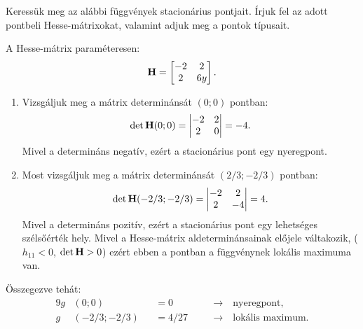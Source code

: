 \begin{exercise}{%
    Keressük meg az alábbi függvények stacionárius pontjait. Írjuk fel az adott
    pontbeli Hesse-mátrixokat, valamint adjuk meg a pontok típusait.
  }
{\begin{enumerate}[a)]
            A Hesse-mátrix paraméteresen:
            \[
              \mathbf{H} = \begin{bmatrix}
                -2 & 2 \\ 2 & 6y
              \end{bmatrix}
              \text.
            \]

            \begin{enumerate}[1)]
              \item Vizsgáljuk meg a mátrix determinánsát $(0; 0)$ pontban:
                    \[
                      \det \mathbf{H}(0;0) = \begin{vmatrix}
                        -2 & 2 \\ 2 & 0
                      \end{vmatrix} = -4 \text.
                    \]
                    Mivel a determináns negatív, ezért a stacionárius pont
                    egy nyeregpont.

              \item Most vizsgáljuk meg a mátrix determinánsát $(2/3; -2/3)$
                    pontban:
                    \[
                      \det \mathbf{H}(-2/3;-2/3) = \begin{vmatrix}
                        -2 & 2 \\ 2 & -4
                      \end{vmatrix} = 4 \text.
                    \]
                    Mivel a determináns pozitív, ezért a stacionárius pont
                    egy lehetséges szélsőérték hely. Mivel a Hesse-mátrix
                    aldeterminánsainak előjele váltakozik, ($h_{11} < 0$,
                    $\det \mathbf{H} > 0$) ezért ebben a pontban a függvénynek
                    lokális maximuma van.
            \end{enumerate}

            Összegezve tehát:
            \begin{alignat*}{9}
              g & (0  ; 0  )   &  & = 0 \quad    &  & \rightarrow \quad
              \text{nyeregpont,}
              \\
              g & (-2/3; -2/3) &  & = 4/27 \quad &  & \rightarrow \quad
              \text{lokális maximum.}
            \end{alignat*}

    \end{enumerate}
  }
\end{exercise}
